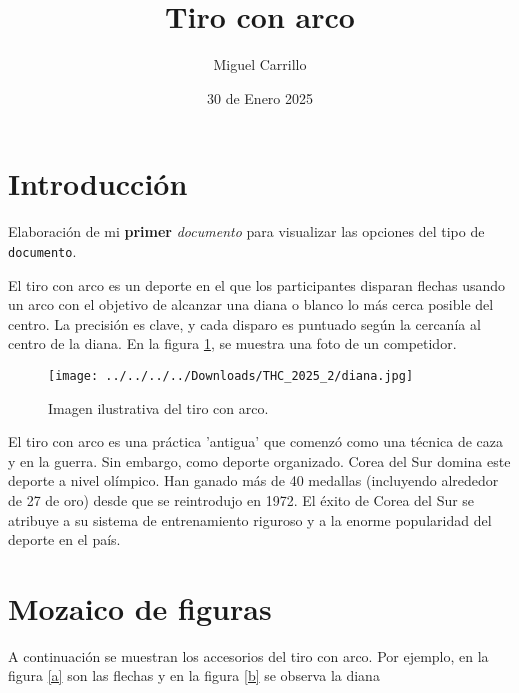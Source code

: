\documentclass[12pt, legalpaper]{article}
\title{\Huge{Tiro con arco}}
\author{\small{Miguel Carrillo}}
\date{30 de Enero 2025}
\begin{document}
\maketitle

\section{\LARGE{Introducción}}

Elaboración de mi \textbf{primer} \emph{documento} para visualizar las opciones del tipo de \texttt{documento}. 

El tiro con \huge{arco} es un deporte en el que los participantes disparan flechas usando un arco con el objetivo de alcanzar una diana o blanco lo más cerca posible del centro. La \large{precisión} es clave, y cada disparo es puntuado según la cercanía al centro de la diana. En la figura \ref{tiro1}, se muestra una foto de un competidor.

\begin{figure}[H]
    \centering
    \texttt{[image: ../../../../Downloads/THC\_2025\_2/diana.jpg]} 
    \caption{Imagen ilustrativa del tiro con arco.}
    \label{tiro1}
\end{figure}

El tiro con arco es una práctica 'antigua' que comenzó como una técnica de caza y en la guerra. Sin embargo, como deporte organizado.
Corea del Sur domina este deporte a nivel olímpico. Han ganado más de 40 medallas (incluyendo alrededor de 27 de oro) desde que se reintrodujo en 1972. El éxito de Corea del Sur se atribuye a su sistema de entrenamiento riguroso y a la enorme popularidad del deporte en el país. 

\section{Mozaico de figuras}

A continuación se muestran los accesorios del tiro con arco. Por ejemplo, en la figura \ref{a} son las flechas y en la figura \ref{b} se observa la diana
\end{document}
